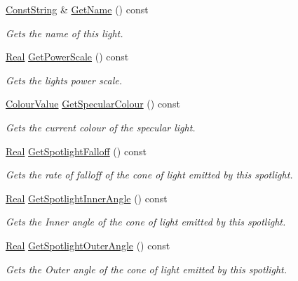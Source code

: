 \begin{DoxyCompactItemize}
\hyperlink{namespacephys_a5ce5049f8b4bf88d6413c47b504ebb31}{ConstString} \& \hyperlink{classphys_1_1Light_a5e85ef1867ad92d589b6cfa96500fcb2}{GetName} () const 
\begin{DoxyCompactList}\small\item\em Gets the name of this light. \item\end{DoxyCompactList}\item 
\hyperlink{namespacephys_af7eb897198d265b8e868f45240230d5f}{Real} \hyperlink{classphys_1_1Light_add09593ac1e57a946aa5f0c319dd56ae}{GetPowerScale} () const 
\begin{DoxyCompactList}\small\item\em Gets the lights power scale. \item\end{DoxyCompactList}\item 
\hyperlink{classphys_1_1ColourValue}{ColourValue} \hyperlink{classphys_1_1Light_a05c7ab32ddb1acf71a041098fbb9ff35}{GetSpecularColour} () const 
\begin{DoxyCompactList}\small\item\em Gets the current colour of the specular light. \item\end{DoxyCompactList}\item 
\hyperlink{namespacephys_af7eb897198d265b8e868f45240230d5f}{Real} \hyperlink{classphys_1_1Light_a7682e55d5210c2433060dd9e4f4669ba}{GetSpotlightFalloff} () const 
\begin{DoxyCompactList}\small\item\em Gets the rate of falloff of the cone of light emitted by this spotlight. \item\end{DoxyCompactList}\item 
\hyperlink{namespacephys_af7eb897198d265b8e868f45240230d5f}{Real} \hyperlink{classphys_1_1Light_a429728b3eb1287806c70a24666705213}{GetSpotlightInnerAngle} () const 
\begin{DoxyCompactList}\small\item\em Gets the Inner angle of the cone of light emitted by this spotlight. \item\end{DoxyCompactList}\item 
\hyperlink{namespacephys_af7eb897198d265b8e868f45240230d5f}{Real} \hyperlink{classphys_1_1Light_a669ab7936e718263d02343ef03333bad}{GetSpotlightOuterAngle} () const 
\begin{DoxyCompactList}\small\item\em Gets the Outer angle of the cone of light emitted by this spotlight. \item\end{DoxyCompactList}\item 

\end{DoxyCompactItemize}
